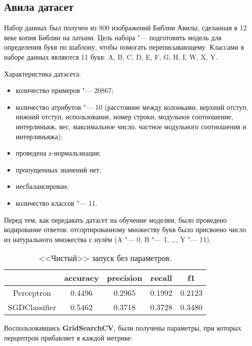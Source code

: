 \subsection{Авила датасет}
Набор данных был получен из 800 изображений Библии Авилы, сделанная в 12 веке копия Библии на латыни. Цель набора "--- подготовить модель для определения букв по шаблону, чтобы помогать переписывающему. Классами в наборе данных являются 11 букв: A, B, C, D, E, F, G, H, I, W, X, Y.

Характеристика датасета:
\begin{itemize}
	\item количество примеров "--- 20867;
	\item количество атрибутов "--- 10 (расстояние между колонками, верхний отступ, нижний отступ, использование, номер строки, модульное соотношение, интерлиньяж, вес, максимальное число, частное модульного соотношения и интерлиньяжа);
	\item проведена z-нормальзиация;
	\item пропущенных значений нет;
	\item несбалансирован;
	\item количество классов "--- 11.
\end{itemize}

Перед тем, как передавать датасет на обучение моделям, было проведено кодирование ответов: отсортированному множеству букв было присвоено число из натурального множества с нулём (A "--- 0, B "--- 1, \dots, Y "--- 11).


\begin{table}[!h]
	\centering
	\begin{tabular}{|c|c|c|c|c|}
		\hline
		& \textbf{accuracy} & \textbf{precision} & \textbf{recall} & \textbf{f1} \\\hline
		Perceptron       & 0.4496 & 0.2965 & 0.1992 & 0.2123 \\\hline
		SGDClassifier    & 0.5462 & 0.3718 & 0.3728 & 0.3480 \\\hline
	\end{tabular}
	\caption{<<Чистый>> запуск без параметров.}
\end{table}

\noindent{}
\newline

Воспользовавшись \textbf{GridSearchCV}, были получены параметры, при которых перцептрон прибавляет в каждой метрике:

